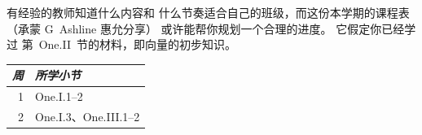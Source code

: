 {有经验的教师知道什么内容和
什么节奏适合自己的班级，而这份本学期的课程表
（承蒙 G~Ashline 惠允分享）
或许能帮你规划一个合理的进度。
它假定你已经学过
第~One.II~节的材料，即向量的初步知识。
\begin{center}
   \begin{tabular}{r|l}
      \multicolumn{1}{r}{\textit{周}}
       &\textit{所学小节}        \\ \hline
       1    &One.I.1--2                 \\
       2    &One.I.3、One.III.1--2      \\

\end{tabular}
\end{center}}
